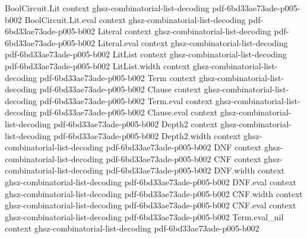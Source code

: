 \begin{lemma}
\label{BoolFourier.inner_product_char_self}
\leanok
{}
\proofstep
  {BoolCircuit.Lit}
  {context}
  {ghsz-combinatorial-list-decoding}
  {pdf-6bd33ae73ade-p005-b002}
\proofstep
  {BoolCircuit.Lit.eval}
  {context}
  {ghsz-combinatorial-list-decoding}
  {pdf-6bd33ae73ade-p005-b002}
\proofstep
  {Literal}
  {context}
  {ghsz-combinatorial-list-decoding}
  {pdf-6bd33ae73ade-p005-b002}
\proofstep
  {Literal.eval}
  {context}
  {ghsz-combinatorial-list-decoding}
  {pdf-6bd33ae73ade-p005-b002}
\proofstep
  {LitList}
  {context}
  {ghsz-combinatorial-list-decoding}
  {pdf-6bd33ae73ade-p005-b002}
\proofstep
  {LitList.width}
  {context}
  {ghsz-combinatorial-list-decoding}
  {pdf-6bd33ae73ade-p005-b002}
\proofstep
  {Term}
  {context}
  {ghsz-combinatorial-list-decoding}
  {pdf-6bd33ae73ade-p005-b002}
\proofstep
  {Clause}
  {context}
  {ghsz-combinatorial-list-decoding}
  {pdf-6bd33ae73ade-p005-b002}
\proofstep
  {Term.eval}
  {context}
  {ghsz-combinatorial-list-decoding}
  {pdf-6bd33ae73ade-p005-b002}
\proofstep
  {Clause.eval}
  {context}
  {ghsz-combinatorial-list-decoding}
  {pdf-6bd33ae73ade-p005-b002}
\proofstep
  {Depth2}
  {context}
  {ghsz-combinatorial-list-decoding}
  {pdf-6bd33ae73ade-p005-b002}
\proofstep
  {Depth2.width}
  {context}
  {ghsz-combinatorial-list-decoding}
  {pdf-6bd33ae73ade-p005-b002}
\proofstep
  {DNF}
  {context}
  {ghsz-combinatorial-list-decoding}
  {pdf-6bd33ae73ade-p005-b002}
\proofstep
  {CNF}
  {context}
  {ghsz-combinatorial-list-decoding}
  {pdf-6bd33ae73ade-p005-b002}
\proofstep
  {DNF.width}
  {context}
  {ghsz-combinatorial-list-decoding}
  {pdf-6bd33ae73ade-p005-b002}
\proofstep
  {DNF.eval}
  {context}
  {ghsz-combinatorial-list-decoding}
  {pdf-6bd33ae73ade-p005-b002}
\proofstep
  {CNF.width}
  {context}
  {ghsz-combinatorial-list-decoding}
  {pdf-6bd33ae73ade-p005-b002}
\proofstep
  {CNF.eval}
  {context}
  {ghsz-combinatorial-list-decoding}
  {pdf-6bd33ae73ade-p005-b002}
\proofstep
  {Term.eval_nil}
  {context}
  {ghsz-combinatorial-list-decoding}
  {pdf-6bd33ae73ade-p005-b002}

\end{lemma}
